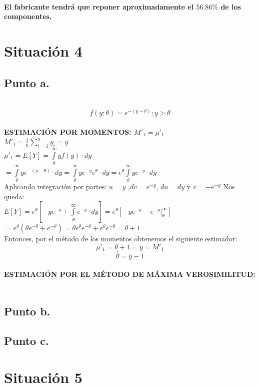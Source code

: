 \documentclass[letterpaper,12pt,onecolumn,titlepage]{article}
\begin{document}
~\\ \textbf{El fabricante tendr\'{a} que reponer aproximadamente el $56.86\%$ de los componentes.}
\pagebreak\section{Situaci\'{o}n 4}
\subsection{Punto a.}
~\\ $$f(y;\theta)=e^{-(y-\theta)};  y>\theta$$  
~\\ \textbf{ESTIMACI\'{O}N POR MOMENTOS: $M'_1=\mu'_1$}
~\\ $M'_1=\frac{1}{n}\sum_{i=1}^{n}{y_{i}}=\bar{y}$
~\\ $\mu'_1=E[Y]=\int \limits_{\theta}^{\infty} y f(y) \cdot dy$
~\\ $=\int \limits_{\theta}^{\infty} ye^{-(y-\theta)} \cdot dy=\int \limits_{\theta}^{\infty} ye^{-y}e^\theta \cdot dy=e^\theta\int \limits_{\theta}^{\infty}ye^{-y} \cdot dy$
~\\ Aplicando integraci\'{o}n por partes: $u=y$ ,$dv=e^{-y}$, $du=dy$ y $v=-e^{-y}$ Nos queda:
~\\ $E[Y]=e^{\theta}[-ye^{-y}+\int \limits_{\theta}^{\infty}e^{-y} \cdot dy] =e^{\theta}[-ye^{-y}- e^{-y}|_{\theta}^{\infty}] $
~\\ $=e^{\theta}(\theta e^{-\theta}+e^{-\theta})=\theta e^{\theta}e^{-\theta}+e^{\theta}e^{-\theta}= \theta + 1 $ 
~\\ Entonces, por el m\'{e}todo de los momentos obtenemos el siguiente estimador:
~\\ $$\mu'_1=\theta + 1= \bar{y} = M'_1$$
 $$\hat{\theta}=\bar{y}-1$$
~\\ \textbf{ESTIMACI\'{O}N POR EL M\'{E}TODO DE M\'{A}XIMA VEROSIMILITUD:}
~\\

\subsection{Punto b.}
\subsection{Punto c.}

\pagebreak\section{Situaci\'{o}n 5}
\end{document}
